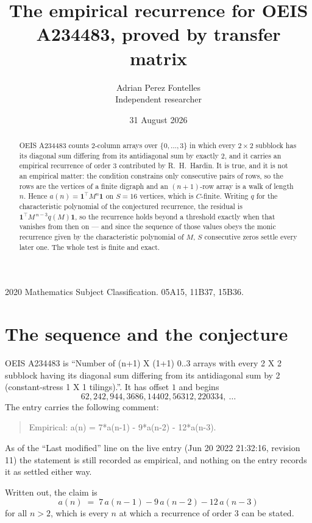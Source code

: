 \documentclass[11pt,a4paper]{article}
\title{The empirical recurrence for OEIS A234483, proved by transfer matrix}
\author{Adrian Perez Fontelles\\ \small Independent researcher}
\date{31 August 2026}
\theoremstyle{plain}
\theoremstyle{definition}
\begin{document}
\maketitle

\begin{abstract}
OEIS A234483 counts $2$-column arrays over $\{0,\dots,3\}$ in which every
$2\times2$ subblock has its diagonal sum differing from its antidiagonal sum by
exactly $2$, and it
carries an empirical recurrence of order $3$ contributed by R.~H.~Hardin. It is true,
and it is not an empirical matter: the condition constrains only consecutive pairs of rows,
so the rows are the vertices of a finite digraph and an $(n+1)$-row array is a walk of
length $n$. Hence $a(n)=\mathbf{1}^{\!\top}M^{n}\mathbf{1}$ on $S=16$ vertices, which
is $C$-finite. Writing $q$ for the characteristic polynomial of the conjectured recurrence,
the residual is $\mathbf{1}^{\!\top}M^{\,n-3}q(M)\mathbf{1}$, so the recurrence
holds beyond a threshold exactly when that vanishes from then on --- and since the sequence
of those values obeys the monic recurrence given by the characteristic polynomial of $M$,
$S$ consecutive zeros settle every later one. The whole test is finite and exact.
\end{abstract}

\noindent\small 2020 Mathematics Subject Classification. 05A15, 11B37, 15B36.\normalsize

\section{The sequence and the conjecture}

OEIS A234483 is ``Number of (n+1) X (1+1) 0..3 arrays with every 2 X 2 subblock having its diagonal sum differing from its antidiagonal sum by 2 (constant-stress 1 X 1 tilings).''. It has offset
$1$ and begins
\[
62, 242, 944, 3686, 14402, 56312, 220334,\ \dots
\]
The entry carries the following comment:
\begin{quote}\small
Empirical: a(n) = 7*a(n-1) - 9*a(n-2) - 12*a(n-3).
\end{quote}
As of the ``Last modified'' line on the live entry (Jun 20 2022 21:32:16, revision 11) the statement is
still recorded as empirical, and nothing on the entry records it as settled either way.

Written out, the claim is
\begin{equation}\label{eq:conj}
a(n)\;=\;7\,a(n-1) - 9\,a(n-2) - 12\,a(n-3)
\end{equation}
for all $n>2$, which is every $n$ at which a recurrence of order $3$ can be
stated.
\end{document}
